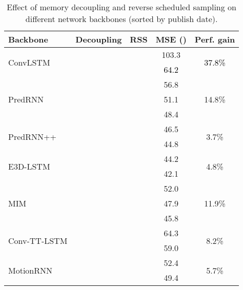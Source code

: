 \documentclass[10pt,journal,compsoc]{IEEEtran}
\newcommand{\revise}[1]{{\textcolor{black}{#1}}}
\begin{document}
\begin{table}[t]
\vskip 0.05in
  \caption{Effect of memory decoupling and reverse scheduled sampling on different network backbones (sorted by publish date).
  }
  \vskip -0.05in
  \setlength{\tabcolsep}{6pt}
  \label{tab:v2_general}
  \centering
  \begin{tabular}{lcccc}
    \toprule
    Backbone & Decoupling & RSS & MSE () & Perf. gain \\
    \midrule
    \multirow{2}{*}{ConvLSTM \cite{shi2015convolutional}} &  &  & 103.3 & \multirow{2}{*}{\revise{37.8\%}} \\
     & \revise{} & \revise{} & \revise{64.2} &  \\
    \midrule
    \multirow{3}{*}{PredRNN} &  &  & 56.8 & \multirow{3}{*}{14.8\%}\\
    &  &  & 51.1 & \\
    &  &  & 48.4 & \\
    \midrule
    \multirow{2}{*}{PredRNN++ \cite{wang2018predrnn++}} &  &  & 46.5 & \multirow{2}{*}{3.7\%} \\
    &  &  & 44.8 \\
    \midrule
    \multirow{2}{*}{E3D-LSTM \cite{wang2019eidetic}} &  &  & 44.2 & \multirow{2}{*}{4.8\%} \\
    &  &  & 42.1 \\
    \midrule
    \multirow{3}{*}{MIM \cite{wang2019memory}} &  &  & 52.0 & \multirow{3}{*}{11.9\%} \\
    &  &  & 47.9 \\
    &  &  & 45.8 \\
\midrule
    \multirow{2}{*}{Conv-TT-LSTM \cite{su2020convolutional}} &  &  & 64.3 & \multirow{2}{*}{8.2\%} \\
    &  &  & 59.0 \\
    \midrule
    \multirow{2}{*}{MotionRNN \cite{wu2021motionrnn}} &  &  & 52.4 & \multirow{2}{*}{5.7\%} \\
    &  &  & 49.4 \\
    \bottomrule
  \end{tabular}
  \vspace{-10pt}
\end{table}
\end{document}
